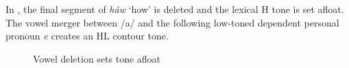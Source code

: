 In , the final segment of \textit{háw} ‘how’ is deleted and the lexical H tone is set afloat. The vowel merger between /a/ and the following low-toned dependent personal pronoun \textit{e} creates an HL contour tone.


\begin{figure}
\caption{Vowel deletion sets tone afloat}
\label{fig:key:3.14}
\end{figure}

